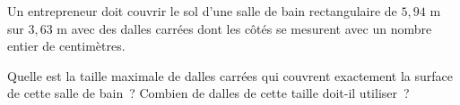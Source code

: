 %
%
Un entrepreneur doit couvrir le sol d'une salle de bain rectangulaire de $5,94$ m sur $3,63$ m avec des dalles carrées dont les côtés se mesurent avec un nombre entier de centimètres.
    \begin{tasks}
        \task Quelle est la taille maximale de dalles carrées qui couvrent exactement la surface de cette salle de bain~?
        \task Combien de dalles de cette taille doit-il utiliser~?
    \end{tasks}
